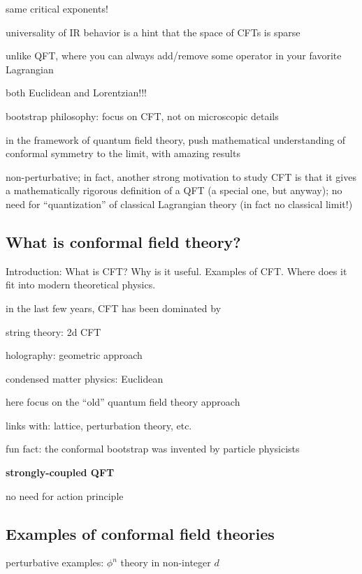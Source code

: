 \documentclass[a4paper,12pt]{article}
\numberwithin{equation}{section}
\begin{document}
same critical exponents!

universality of IR behavior is a hint that the space of CFTs is sparse

unlike QFT, where you can always add/remove some operator in your favorite Lagrangian

both Euclidean and Lorentzian!!!


bootstrap philosophy: focus on CFT, not on microscopic details

in the framework of quantum field theory, push mathematical understanding of conformal symmetry to the limit, with amazing results


non-perturbative;
in fact, another strong motivation to study CFT is that it gives a mathematically rigorous definition of a QFT (a special one, but anyway);
no need for ``quantization'' of classical Lagrangian theory (in fact no classical limit!)




\subsection{What is conformal field theory?}

Introduction: What is CFT? Why is it useful. Examples of CFT. Where does it fit into modern theoretical physics.


in the last few years, CFT has been dominated by 

string theory: 2d CFT

holography: geometric approach

condensed matter physics: Euclidean


here focus on the ``old'' quantum field theory approach

links with: lattice, perturbation theory, etc.

fun fact: the conformal bootstrap was invented by particle physicists


\textbf{strongly-coupled QFT}

no need for action principle


\subsection{Examples of conformal field theories}

perturbative examples: $\phi^n$ theory in non-integer $d$
\end{document}
